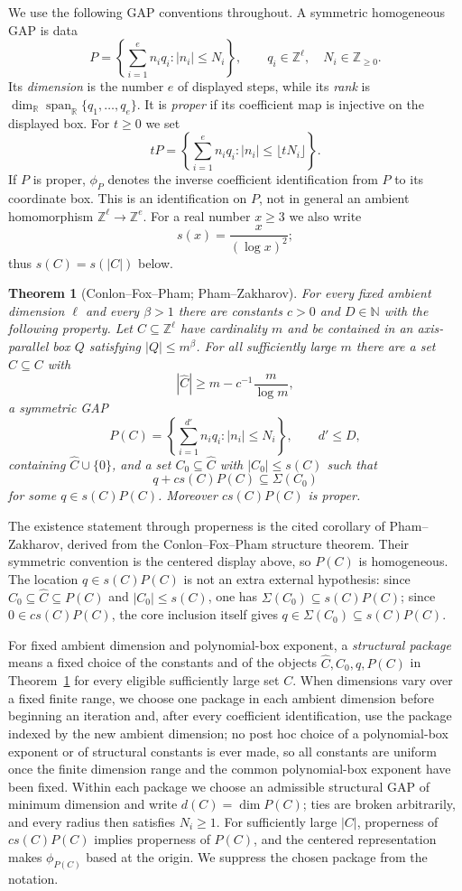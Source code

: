 \documentclass[11pt,reqno]{amsart}
\newtheorem{theorem}{Theorem}[section]
\theoremstyle{definition}
\theoremstyle{remark}
\newcommand{\Z}{\mathbb Z}
\newcommand{\R}{\mathbb R}
\newcommand{\Span}{\operatorname{span}}
\newcommand{\SigmaSet}{\Sigma}
\begin{document}
We use the following GAP conventions throughout.  A symmetric homogeneous GAP
is data
\[
 P=\left\{\sum_{i=1}^e n_iq_i:|n_i|\le N_i\right\},
 \qquad q_i\in\Z^\ell,\quad N_i\in\Z_{\ge0}.
\]
Its \emph{dimension} is the number $e$ of displayed steps, while its
\emph{rank} is $\dim_{\R}\Span_{\R}\{q_1,\dots,q_e\}$.  It is
\emph{proper} if its coefficient map is injective on the displayed box.  For
$t\ge0$ we set
\[
 tP=\left\{\sum_{i=1}^e n_iq_i:|n_i|\le\lfloor tN_i\rfloor\right\}.
\]
If $P$ is proper, $\phi_P$ denotes the inverse coefficient identification from
$P$ to its coordinate box.  This is an identification on $P$, not in general
an ambient homomorphism $\Z^\ell\to\Z^e$.  For a real number $x\ge3$ we also
write
\[
 s(x)=\frac{x}{(\log x)^2};
\]
thus $s(C)=s(|C|)$ below.

\begin{theorem}[Conlon--Fox--Pham; Pham--Zakharov]
\label{thm:cfp-structure}
For every fixed ambient dimension $\ell$ and every $\beta>1$ there are constants $c>0$ and $D\in\mathbb N$ with the following property.  Let $C\subseteq\Z^\ell$ have cardinality $m$ and be contained in an axis-parallel box $Q$ satisfying $|Q|\le m^\beta$.  For all sufficiently large $m$ there are a set $\widehat C\subseteq C$ with
\[
 |\widehat C|\ge m-c^{-1}\frac{m}{\log m},
\]
a symmetric GAP
\[
 P(C)=\left\{\sum_{i=1}^{d'}n_iq_i:|n_i|\le N_i\right\},
 \qquad d'\le D,
\]
containing $\widehat C\cup\{0\}$, and a set $C_0\subseteq\widehat C$ with $|C_0|\le s(C)$ such that
\[
 q+c s(C)P(C)\subseteq\SigmaSet(C_0)
\]
for some $q\in s(C)P(C)$.  Moreover $c s(C)P(C)$ is proper.
\end{theorem}

The existence statement through properness is the cited corollary of Pham--Zakharov, derived from the Conlon--Fox--Pham structure theorem.  Their symmetric convention is the centered display above, so $P(C)$ is homogeneous.  The location $q\in s(C)P(C)$ is not an extra external hypothesis: since $C_0\subseteq\widehat C\subseteq P(C)$ and $|C_0|\le s(C)$, one has $\SigmaSet(C_0)\subseteq s(C)P(C)$; since $0\in c s(C)P(C)$, the core inclusion itself gives $q\in\SigmaSet(C_0)\subseteq s(C)P(C)$.

For fixed ambient dimension and polynomial-box exponent, a
\emph{structural package} means a fixed choice of the constants and of the
objects $\widehat C,C_0,q,P(C)$ in Theorem~\ref{thm:cfp-structure} for every
eligible sufficiently large set $C$.  When dimensions vary over a fixed
finite range, we choose one package in each ambient dimension before
beginning an iteration and, after every coefficient identification, use
the package indexed by the new ambient dimension; no post hoc choice of a
polynomial-box exponent or of structural constants is ever made, so all
constants are uniform once the finite dimension range and the common
polynomial-box exponent have been fixed.  Within each package we choose
an admissible structural GAP of minimum dimension and write
$d(C)=\dim P(C)$; ties are broken arbitrarily, and every radius then
satisfies $N_i\ge1$.  For sufficiently large $|C|$, properness of
$cs(C)P(C)$ implies properness of $P(C)$, and the centered representation
makes $\phi_{P(C)}$ based at the origin.  We suppress the chosen package
from the notation.
\end{document}
